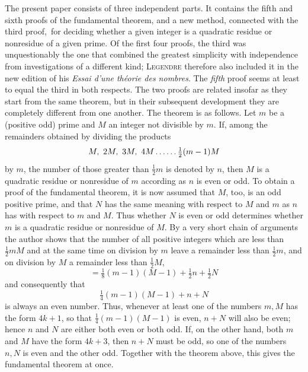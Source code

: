 The present paper consists of three independent parts. It contains the fifth and sixth proofs of the fundamental theorem, and a new method, connected with the third proof,\textperiodcentered\ for deciding whether a given integer is a quadratic residue or nonresidue of a given prime. Of the first four proofs, the third was unquestionably the one that combined the greatest simplicity with independence from investigations of a different kind; \textsc{Legendre} therefore also included it in the new edition of his \emph{Essai d'une théorie des nombres}. The \emph{fifth} proof seems at least to equal the third in both respects. The two proofs are related insofar as they start from the same theorem, but in their subsequent development they are completely different from %
one another. The theorem is as follows. Let $m$ be a (positive odd) prime and $M$ an integer not divisible by $m$. If, among the remainders obtained by dividing the products
\[
M,\ 2M,\ 3M,\ 4M\mathinner{.\,.\,.\,.\,.\,.}\tfrac12(m-1)M
\]
by $m$, the number of those greater than $\frac12m$ is denoted by $n$, then $M$ is a quadratic residue or nonresidue of $m$ according as $n$ is even or odd. To obtain a proof of the fundamental theorem, it is now assumed that $M$, too, is an odd positive prime, and that $N$ has the same meaning with respect to $M$ and $m$ as $n$ has with respect to $m$ and $M$. Thus whether $N$ is even or odd determines whether $m$ is a quadratic residue or nonresidue of $M$. By a very short chain of arguments the author shows that the number of all positive integers which are less than $\frac12mM$ and at the same time on division by $m$ leave a remainder less than $\frac12m$, and on division by $M$ a remainder less than $\frac12M$,
\[
=\tfrac18(m-1)(M-1)+\tfrac12n+\tfrac12N
\]
and consequently that
\[
\tfrac14(m-1)(M-1)+n+N
\]
is always an even number. Thus, whenever at least one of the numbers $m,M$ has the form $4k+1$, so that $\frac14(m-1)(M-1)$ is even, $n+N$ will also be even; hence $n$ and $N$ are either both even or both odd. If, on the other hand, both $m$ and $M$ have the form $4k+3$, then $n+N$ must be odd, so one of the numbers $n,N$ is even and the other odd. Together with the theorem above, this gives the fundamental theorem at once.

